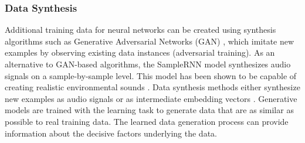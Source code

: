 \documentclass[11pt]{article}
\begin{document}





\subsubsection{Data Synthesis}
Additional training data for neural networks can be created using synthesis algorithms such as Generative Adversarial Networks (GAN) \cite{Goodfellow:2014:GAN:NIPS}, which imitate new examples by observing existing data instances (adversarial training). As an alternative to GAN-based algorithms, the SampleRNN model synthesizes audio signals on a sample-by-sample level. This model has been shown to be capable of creating realistic environmental sounds \cite{Kong:2019:SceneGeneration:ICASSP}.
Data synthesis methods either synthesize new examples as audio signals \cite{Mun:2017:ASC:ICASSP, Chen:2019:ASC:DCASE} or as intermediate embedding vectors \cite{Mun:2017:GANASC:DCASE}.  
Generative models \cite{salakhutdinov2015learning} are trained with the learning task to generate data that are as similar as possible to real training data. 
The learned data generation process can provide information about the decisive factors underlying the data.
\end{document}
